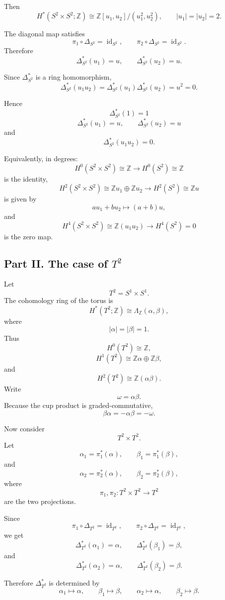 \documentclass[12pt,a4paper]{article}
\theoremstyle{notespace}
\begin{document}
Then
\[
H^*(S^2\times S^2;\mathbb Z)
\cong
\mathbb Z[u_1,u_2]/(u_1^2,u_2^2),
\qquad
|u_1|=|u_2|=2.
\]

The diagonal map satisfies
\[
\pi_1\circ \Delta_{S^2}=\operatorname{id}_{S^2},
\qquad
\pi_2\circ \Delta_{S^2}=\operatorname{id}_{S^2}.
\]
Therefore
\[
\Delta_{S^2}^*(u_1)=u,
\qquad
\Delta_{S^2}^*(u_2)=u.
\]

Since \(\Delta_{S^2}^*\) is a ring homomorphism,
\[
\Delta_{S^2}^*(u_1u_2)
=
\Delta_{S^2}^*(u_1)\Delta_{S^2}^*(u_2)
=
u^2
=
0.
\]

Hence
\[
\boxed{
	\Delta_{S^2}^*(1)=1
}
\]
\[
\boxed{
	\Delta_{S^2}^*(u_1)=u,
	\qquad
	\Delta_{S^2}^*(u_2)=u
}
\]
and
\[
\boxed{
	\Delta_{S^2}^*(u_1u_2)=0.
}
\]

Equivalently, in degrees:
\[
H^0(S^2\times S^2)\cong \mathbb Z
\longrightarrow
H^0(S^2)\cong \mathbb Z
\]
is the identity,
\[
H^2(S^2\times S^2)\cong \mathbb Z u_1\oplus \mathbb Z u_2
\longrightarrow
H^2(S^2)\cong \mathbb Z u
\]
is given by
\[
au_1+bu_2\longmapsto (a+b)u,
\]
and
\[
H^4(S^2\times S^2)\cong \mathbb Z(u_1u_2)
\longrightarrow
H^4(S^2)=0
\]
is the zero map.

\subsection*{Part II. The case of \(T^2\)}

Let
\[
T^2=S^1\times S^1.
\]
The cohomology ring of the torus is
\[
H^*(T^2;\mathbb Z)
\cong
\Lambda_{\mathbb Z}(\alpha,\beta),
\]
where
\[
|\alpha|=|\beta|=1.
\]
Thus
\[
H^0(T^2)\cong \mathbb Z,
\]
\[
H^1(T^2)\cong \mathbb Z\alpha\oplus \mathbb Z\beta,
\]
and
\[
H^2(T^2)\cong \mathbb Z(\alpha\beta).
\]
Write
\[
\omega=\alpha\beta.
\]
Because the cup product is graded-commutative,
\[
\beta\alpha=-\alpha\beta=-\omega.
\]

Now consider
\[
T^2\times T^2.
\]
Let
\[
\alpha_1=\pi_1^*(\alpha),
\qquad
\beta_1=\pi_1^*(\beta),
\]
and
\[
\alpha_2=\pi_2^*(\alpha),
\qquad
\beta_2=\pi_2^*(\beta),
\]
where
\[
\pi_1,\pi_2:T^2\times T^2\to T^2
\]
are the two projections.

Since
\[
\pi_1\circ \Delta_{T^2}
=
\operatorname{id}_{T^2},
\qquad
\pi_2\circ \Delta_{T^2}
=
\operatorname{id}_{T^2},
\]
we get
\[
\Delta_{T^2}^*(\alpha_1)=\alpha,
\qquad
\Delta_{T^2}^*(\beta_1)=\beta,
\]
and
\[
\Delta_{T^2}^*(\alpha_2)=\alpha,
\qquad
\Delta_{T^2}^*(\beta_2)=\beta.
\]

Therefore \(\Delta_{T^2}^*\) is determined by
\[
\boxed{
	\alpha_1\mapsto \alpha,
	\qquad
	\beta_1\mapsto \beta,
	\qquad
	\alpha_2\mapsto \alpha,
	\qquad
	\beta_2\mapsto \beta.
}
\]
\end{document}
